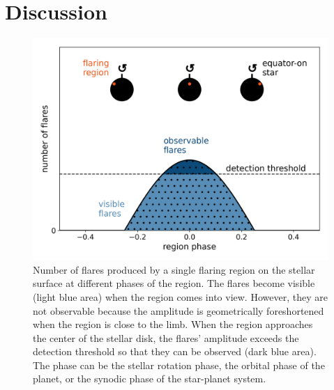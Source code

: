 \documentclass[fleqn,usenatbib]{mnras}%
\begin{document}


\section{Discussion}
\label{sec:discussion}
\begin{figure}
\includegraphics[width=\hsize]{figures/observability_illustration.png} 
\caption{Number of flares produced by a single flaring region on the stellar surface at different phases of the region. The flares become visible (light blue area) when the region comes into view. However, they are not observable because the amplitude is geometrically foreshortened when the region is close to the limb. When the region approaches the center of the stellar disk, the flares' amplitude exceeds the detection threshold so that they can be observed (dark blue area). The phase can be the stellar rotation phase, the orbital phase of the planet, or the synodic phase of the star-planet system.}
\label{fig:observability}
\end{figure}
\end{document}
